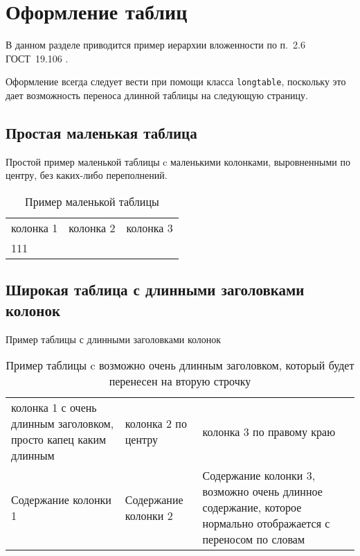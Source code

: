 \newpage\section{Оформление таблиц}

В данном разделе приводится пример иерархии вложенности по п.~2.6 ГОСТ~19.106 \cite{gost19106}.

Оформление всегда следует вести при помощи класса \lstinline|longtable|, поскольку это дает возможность переноса длинной таблицы на следующую страницу.

\subsection{Простая маленькая таблица}

Простой пример маленькой таблицы c маленькими колонками, выровненными по центру, без каких-либо переполнений.
{\tabletextsize
\begin{longtable}[c]{| >{\centering}m{25mm} | >{\centering}m{25mm} | >{\centering}m{50mm} |}
	\caption{\normalsize Пример маленькой таблицы\hspace{25cm}} %
	\label{t:tab0} \\		
	\hline %
	колонка 1 & колонка 2 & колонка 3 \tabularnewline
	\hhline{|=|=|=|} %
	111 & 222 & 333
	\tabularnewline\hline %
\end{longtable}
}

\subsection{Широкая таблица с длинными заголовками колонок}

Пример таблицы с длинными заголовками колонок
{\tabletextsize
\begin{longtable}[c]{| >{\raggedright}m{55mm} | >{\centering}m{55mm} | >{\raggedleft}m{55mm} |}
	\caption{\normalsize Пример таблицы c возможно очень длинным заголовком, который будет перенесен на вторую строчку\hspace{25cm}} %
	\label{t:tab1} \\		
	\hline %
	колонка 1 с очень длинным заголовком, просто капец каким длинным & колонка 2 по центру & колонка 3 по правому краю \tabularnewline
	\hhline{|=|=|=|} %
	Содержание колонки 1 & Содержание колонки 2 & Содержание колонки 3, возможно очень длинное содержание, которое нормально отображается с переносом по словам
	\tabularnewline\hline %
\end{longtable}
}


